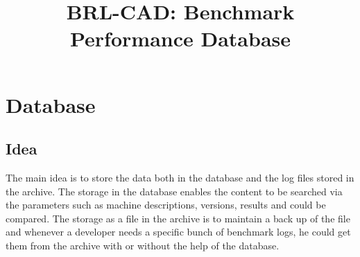 \documentclass[a4paper,12pt, titlepage]{article}
\title{BRL-CAD: Benchmark Performance Database}
\begin{document}
\maketitle

\tableofcontents



\section{Database}
\subsection{Idea}
The main idea is to store the data both in the database and the log files stored in the archive. The storage in the database enables the content to be searched via the parameters such as machine descriptions, versions, results and could be compared. The storage as a file in the archive is to maintain a back up of the file and whenever a developer needs a specific bunch of benchmark logs, he could get them from the archive with or without the help of the database. 
\end{document}
